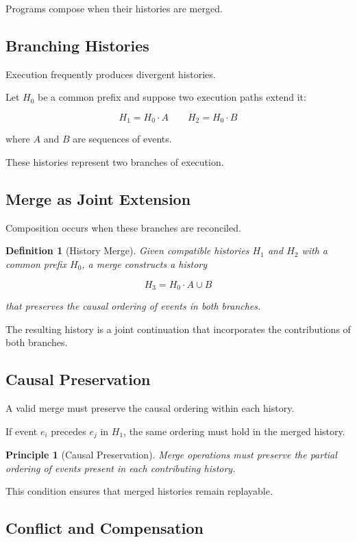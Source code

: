 \documentclass[12pt]{article}
\newtheorem{definition}{Definition}
\newtheorem{principle}{Principle}
\begin{document}
Programs compose when their histories are merged.

\subsection{Branching Histories}

Execution frequently produces divergent histories.

Let $H_0$ be a common prefix and suppose two execution
paths extend it:

\[
H_1 = H_0 \cdot A
\qquad
H_2 = H_0 \cdot B
\]

where $A$ and $B$ are sequences of events.

These histories represent two branches of execution.

\subsection{Merge as Joint Extension}

Composition occurs when these branches are reconciled.

\begin{definition}[History Merge]
Given compatible histories $H_1$ and $H_2$ with a common
prefix $H_0$, a merge constructs a history

\[
H_3 = H_0 \cdot A \cup B
\]

that preserves the causal ordering of events in both
branches.
\end{definition}

The resulting history is a joint continuation that
incorporates the contributions of both branches.

\subsection{Causal Preservation}

A valid merge must preserve the causal ordering
within each history.

If event $e_i$ precedes $e_j$ in $H_1$, the same ordering
must hold in the merged history.

\begin{principle}[Causal Preservation]
Merge operations must preserve the partial ordering
of events present in each contributing history.
\end{principle}

This condition ensures that merged histories remain
replayable.

\subsection{Conflict and Compensation}
\end{document}
